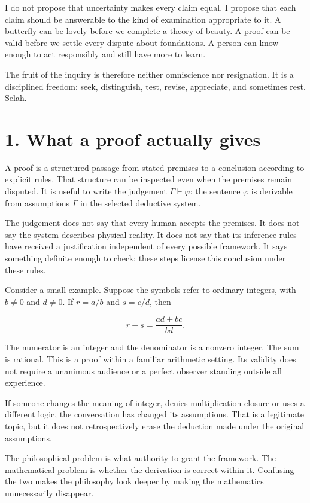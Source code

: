 \documentclass[10pt]{article}
\begin{document}
I do not propose that uncertainty makes every claim equal. I propose that each claim should be answerable to the kind of examination appropriate to it. A butterfly can be lovely before we complete a theory of beauty. A proof can be valid before we settle every dispute about foundations. A person can know enough to act responsibly and still have more to learn.

The fruit of the inquiry is therefore neither omniscience nor resignation. It is a disciplined freedom: seek, distinguish, test, revise, appreciate, and sometimes rest. Selah.

\clearpage
\section*{1. What a proof actually gives}
A proof is a structured passage from stated premises to a conclusion according to explicit rules. That structure can be inspected even when the premises remain disputed. It is useful to write the judgement $\Gamma\vdash\varphi$: the sentence $\varphi$ is derivable from assumptions $\Gamma$ in the selected deductive system.

The judgement does not say that every human accepts the premises. It does not say the system describes physical reality. It does not say that its inference rules have received a justification independent of every possible framework. It says something definite enough to check: these steps license this conclusion under these rules.

Consider a small example. Suppose the symbols refer to ordinary integers, with $b\ne0$ and $d\ne0$. If $r=a/b$ and $s=c/d$, then

\[
r+s=\frac{ad+bc}{bd}.
\]

The numerator is an integer and the denominator is a nonzero integer. The sum is rational. This is a proof within a familiar arithmetic setting. Its validity does not require a unanimous audience or a perfect observer standing outside all experience.

If someone changes the meaning of integer, denies multiplication closure or uses a different logic, the conversation has changed its assumptions. That is a legitimate topic, but it does not retrospectively erase the deduction made under the original assumptions.

The philosophical problem is what authority to grant the framework. The mathematical problem is whether the derivation is correct within it. Confusing the two makes the philosophy look deeper by making the mathematics unnecessarily disappear.
\end{document}
